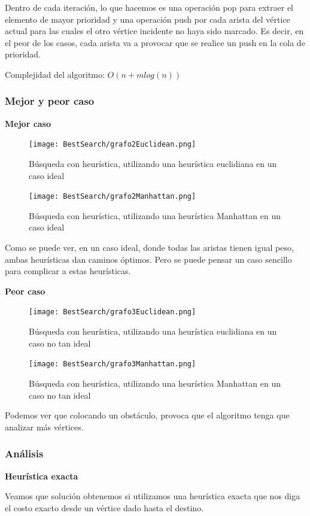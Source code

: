 Dentro de cada iteración, lo que hacemos es una operación pop para extraer el elemento de mayor prioridad y una operación push por cada arista del vértice actual para las cuales el otro vértice incidente no haya sido marcado. Es decir, en el peor de los casos, cada arista va a provocar que se realice un push en la cola de prioridad.

Complejidad del algoritmo: $O(n + mlog(n))$
\subsubsection{Mejor y peor caso}
\textbf{Mejor caso}
\begin{figure}[H]
\centering
\texttt{[image: BestSearch/grafo2Euclidean.png]}
\caption{Búsqueda con heurística, utilizando una heurística euclidiana en un caso ideal}
\end{figure}
\begin{figure}[H]
\centering
\texttt{[image: BestSearch/grafo2Manhattan.png]}
\caption{Búsqueda con heurística, utilizando una heurística Manhattan en un caso ideal}
\end{figure}

Como se puede ver, en un caso ideal, donde todas las aristas tienen igual peso, ambas heurísticas dan caminos óptimos. Pero se puede pensar un caso sencillo para complicar a estas heurísticas.

\textbf{Peor caso}
\begin{figure}[H]
\centering
\texttt{[image: BestSearch/grafo3Euclidean.png]}
\caption{Búsqueda con heurística, utilizando una heurística euclidiana en un caso no tan ideal}
\end{figure}
\begin{figure}[H]
\centering
\texttt{[image: BestSearch/grafo3Manhattan.png]}
\caption{Búsqueda con heurística, utilizando una heurística Manhattan en un caso no tan ideal}
\end{figure}

Podemos ver que colocando un obstáculo, provoca que el algoritmo tenga que analizar más vértices.

\subsubsection{Análisis}
\textbf{Heurística exacta}

Veamos que solución obtenemos si utilizamos una heurística exacta que nos diga el costo exacto desde un vértice dado hasta el destino.


